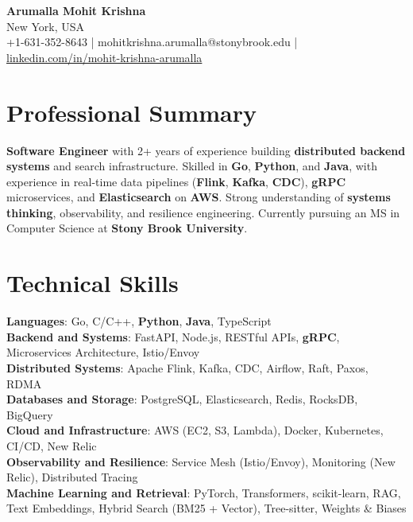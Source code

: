 \documentclass[letterpaper,11pt]{article}
\begin{document}
\begin{center}
  {\Large \textbf{Arumalla Mohit Krishna}} \\
  New York, USA \\
  +1-631-352-8643 \enspace | \enspace mohitkrishna.arumalla@stonybrook.edu \enspace | \enspace \href{https://www.linkedin.com/in/mohit-krishna-arumalla}{linkedin.com/in/mohit-krishna-arumalla}
\end{center}

\section{Professional Summary}
  \begin{itemize}[leftmargin=0.15in, label={}]
    \small{\item{
     \textbf{Software Engineer} with 2+ years of experience building \textbf{distributed backend systems} and search infrastructure. Skilled in \textbf{Go}, \textbf{Python}, and \textbf{Java}, with experience in real-time data pipelines (\textbf{Flink}, \textbf{Kafka}, \textbf{CDC}), \textbf{gRPC} microservices, and \textbf{Elasticsearch} on \textbf{AWS}. Strong understanding of \textbf{systems thinking}, observability, and resilience engineering. Currently pursuing an MS in Computer Science at \textbf{Stony Brook University}.
    }}
  \end{itemize}
\vspace{-16pt}

\section{Technical Skills}
 \begin{itemize}[leftmargin=0.15in, label={}]
    \small{\item{
     \textbf{Languages}: Go, C/C++, \textbf{Python}, \textbf{Java}, TypeScript \\
     \textbf{Backend and Systems}: FastAPI, Node.js, RESTful APIs, \textbf{gRPC}, Microservices Architecture, Istio/Envoy \\
     \textbf{Distributed Systems}: Apache Flink, Kafka, CDC, Airflow, Raft, Paxos, RDMA \\
     \textbf{Databases and Storage}: PostgreSQL, Elasticsearch, Redis, RocksDB, BigQuery \\
     \textbf{Cloud and Infrastructure}: AWS (EC2, S3, Lambda), Docker, Kubernetes, CI/CD, New Relic \\
     \textbf{Observability and Resilience}: Service Mesh (Istio/Envoy), Monitoring (New Relic), Distributed Tracing \\
     \textbf{Machine Learning and Retrieval}: PyTorch, Transformers, scikit-learn, RAG, Text Embeddings, Hybrid Search (BM25 + Vector), Tree-sitter, Weights \& Biases
    }}
 \end{itemize}
\vspace{-16pt}
\end{document}
